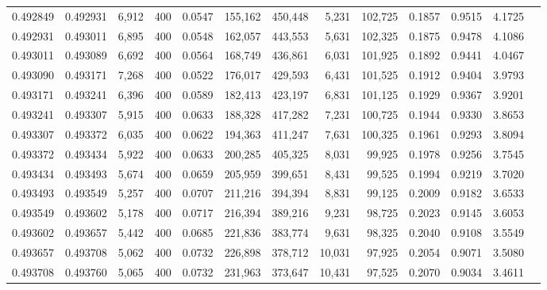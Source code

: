 \begin{tabular}{rrrrrrrrrrrrr}
0.492849 & 0.492931 &  6,912 & 400 &                                     0.0547 & 155,162 & 450,448 &   5,231 & 102,725 & 0.1857 & 0.9515 & 4.1725 \\
0.492931 & 0.493011 &  6,895 & 400 &                                     0.0548 & 162,057 & 443,553 &   5,631 & 102,325 & 0.1875 & 0.9478 & 4.1086 \\
0.493011 & 0.493089 &  6,692 & 400 &                                     0.0564 & 168,749 & 436,861 &   6,031 & 101,925 & 0.1892 & 0.9441 & 4.0467 \\
0.493090 & 0.493171 &  7,268 & 400 &                                     0.0522 & 176,017 & 429,593 &   6,431 & 101,525 & 0.1912 & 0.9404 & 3.9793 \\
0.493171 & 0.493241 &  6,396 & 400 &                                     0.0589 & 182,413 & 423,197 &   6,831 & 101,125 & 0.1929 & 0.9367 & 3.9201 \\
0.493241 & 0.493307 &  5,915 & 400 &                                     0.0633 & 188,328 & 417,282 &   7,231 & 100,725 & 0.1944 & 0.9330 & 3.8653 \\
0.493307 & 0.493372 &  6,035 & 400 &                                     0.0622 & 194,363 & 411,247 &   7,631 & 100,325 & 0.1961 & 0.9293 & 3.8094 \\
0.493372 & 0.493434 &  5,922 & 400 &                                     0.0633 & 200,285 & 405,325 &   8,031 &  99,925 & 0.1978 & 0.9256 & 3.7545 \\
0.493434 & 0.493493 &  5,674 & 400 &                                     0.0659 & 205,959 & 399,651 &   8,431 &  99,525 & 0.1994 & 0.9219 & 3.7020 \\
0.493493 & 0.493549 &  5,257 & 400 &                                     0.0707 & 211,216 & 394,394 &   8,831 &  99,125 & 0.2009 & 0.9182 & 3.6533 \\
0.493549 & 0.493602 &  5,178 & 400 &                                     0.0717 & 216,394 & 389,216 &   9,231 &  98,725 & 0.2023 & 0.9145 & 3.6053 \\
0.493602 & 0.493657 &  5,442 & 400 &                                     0.0685 & 221,836 & 383,774 &   9,631 &  98,325 & 0.2040 & 0.9108 & 3.5549 \\
0.493657 & 0.493708 &  5,062 & 400 &                                     0.0732 & 226,898 & 378,712 &  10,031 &  97,925 & 0.2054 & 0.9071 & 3.5080 \\
0.493708 & 0.493760 &  5,065 & 400 &                                     0.0732 & 231,963 & 373,647 &  10,431 &  97,525 & 0.2070 & 0.9034 & 3.4611 \\

\end{tabular}
